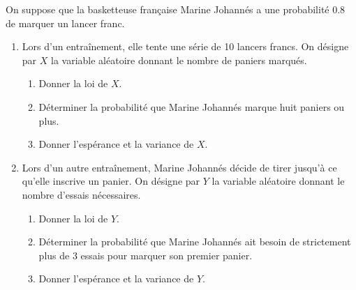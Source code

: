 \begin{td-exo}[] %
    On suppose que la basketteuse française Marine Johannés a une 
    probabilité 0.8 de marquer un lancer franc.
    \begin{enumerate}
        \item Lors d'un entraînement, elle tente une série de 10 lancers
        francs. On désigne par \(X\) la variable aléatoire donnant le
        nombre de paniers marqués.
        \begin{enumerate}
            \item Donner la loi de \(X\).
            
            \item Déterminer la probabilité que Marine Johannés marque
            huit paniers ou plus.

            \item Donner l'espérance et la variance de \(X\).
        \end{enumerate}

        \item Lors d'un autre entraînement, Marine Johannés décide de
        tirer jusqu'à ce qu'elle inscrive un panier. On désigne par \(Y\)
        la variable aléatoire donnant le nombre d'essais nécessaires.
        \begin{enumerate}
            \item Donner la loi de \(Y\).

            \item Déterminer la probabilité que Marine Johannés ait besoin
            de strictement plus de 3 essais pour marquer son premier panier.

            \item Donner l'espérance et la variance de \(Y\).
        \end{enumerate}
    \end{enumerate}
\end{td-exo}
